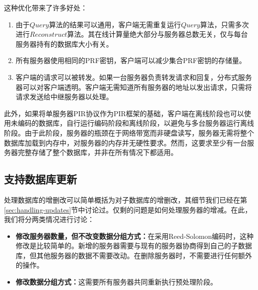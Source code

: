 这种优化带来了许多好处：
\begin{enumerate}
    \item 由于$Query$算法的结果可以通用，客户端无需重复运行$Query$算法，只需多次进行$Reconstruct$算法。其在线计算量绝大部分与服务器总数无关，仅与每台服务器持有的数据库大小有关。
    \item 所有服务器使用相同的PRF密钥，客户端可以减少集合PRF密钥的存储量。
    \item 客户端的请求可以被转发。如果一台服务器负责转发请求和回复，分布式服务器可以对客户端透明。客户端无需知道所有服务器的地址以发出请求，只需将请求发送给中继服务器以处理。
\end{enumerate}

此外，如果将单服务器PIR协议作为PIR框架的基础，客户端在离线阶段也可以使用未编码的数据库，自行运行编码阶段和离线阶段，以避免与多台服务器运行离线阶段。由于此阶段，服务器的瓶颈在于网络带宽而非硬盘读写，服务器无需将整个数据库加载到内存中，对服务器的内存并无硬性要求。然而，这要求至少有一台服务器完整存储了整个数据库，并非在所有情况下都适用。

\subsection{支持数据库更新}

处理数据库的增删改可以简单概括为对子数据库的增删改，其细节我们已经在第\ref{sec:handling-updates}节中讨论过。仅剩的问题是如何处理服务器的增减。在此，我们将分两类情况进行讨论：
\begin{itemize}
    \item \textbf{修改服务器数量，但不改变数据分组方式：}在采用Reed-Solomon编码时，这种修改是比较简单的。新增的服务器需要与现有的服务器协商得到自己的子数据库，但其他服务器的数据不需要改动。在删除服务器时，不需要进行任何额外的操作。
    \item \textbf{修改数据分组方式：}这需要所有服务器共同重新执行预处理阶段。
\end{itemize}

